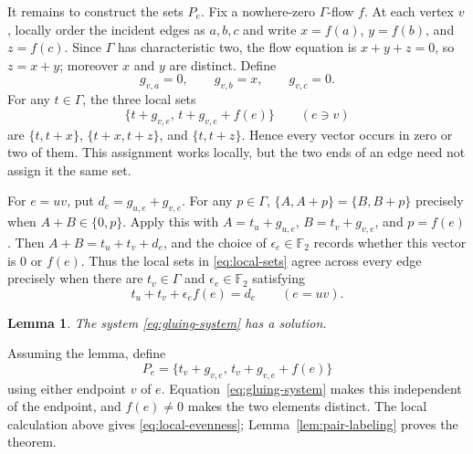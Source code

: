\documentclass{amsart}
\newtheorem{lemma}[theorem]{Lemma}
\newcommand{\F}{\mathbb{F}}
\begin{document}
It remains to construct the sets $P_e$. Fix a nowhere-zero $\Gamma$-flow $f$.
At each vertex $v$, locally order the incident edges as $a,b,c$ and write
$x=f(a)$, $y=f(b)$, and $z=f(c)$. Since $\Gamma$ has characteristic two, the
flow equation is $x+y+z=0$, so $z=x+y$; moreover $x$ and $y$ are distinct.
Define
\begin{equation}\label{eq:g-definition}
  g_{v,a}=0,\qquad g_{v,b}=x,\qquad g_{v,c}=0.
\end{equation}
For any $t\in\Gamma$, the three local sets
\begin{equation}\label{eq:local-sets}
  \{t+g_{v,e},\,t+g_{v,e}+f(e)\}\qquad(e\ni v)
\end{equation}
are $\{t,t+x\}$, $\{t+x,t+z\}$, and $\{t,t+z\}$. Hence every vector occurs in
zero or two of them. This assignment works locally, but the two ends of an
edge need not assign it the same set.

For $e=uv$, put $d_e=g_{u,e}+g_{v,e}$. For any $p\in\Gamma$,
$\{A,A+p\}=\{B,B+p\}$ precisely when $A+B\in\{0,p\}$. Apply this with
$A=t_u+g_{u,e}$, $B=t_v+g_{v,e}$, and $p=f(e)$. Then
$A+B=t_u+t_v+d_e$, and the choice of $\epsilon_e\in\F_2$ records whether this
vector is $0$ or $f(e)$. Thus the local sets in \eqref{eq:local-sets} agree
across every edge precisely when there are $t_v\in\Gamma$ and
$\epsilon_e\in\F_2$ satisfying
\begin{equation}\label{eq:gluing-system}
  t_u+t_v+\epsilon_e f(e)=d_e\qquad(e=uv).
\end{equation}

\begin{lemma}\label{lem:linear-system}
The system \eqref{eq:gluing-system} has a solution.
\end{lemma}

Assuming the lemma, define
\[
  P_e=\{t_v+g_{v,e},\,t_v+g_{v,e}+f(e)\}
\]
using either endpoint $v$ of $e$. Equation~\eqref{eq:gluing-system} makes this
independent of the endpoint, and $f(e)\ne 0$ makes the two elements distinct.
The local calculation above gives \eqref{eq:local-evenness};
Lemma~\ref{lem:pair-labeling} proves the theorem.
\end{document}
